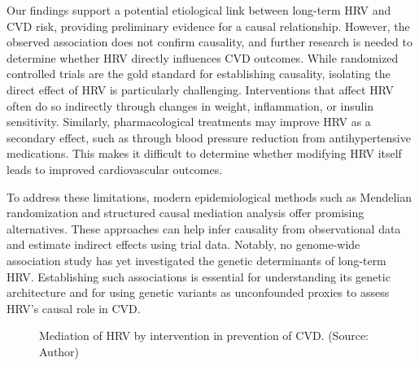 \documentclass[
  a4paper,
  headsepline=true,
  open=any]{scrbook}
\begin{document}
Our findings support a potential etiological link between long-term HRV
and CVD risk, providing preliminary evidence for a causal relationship.
However, the observed association does not confirm causality, and
further research is needed to determine whether HRV directly influences
CVD outcomes. While randomized controlled trials are the gold standard
for establishing causality, isolating the direct effect of HRV is
particularly challenging. Interventions that affect HRV often do so
indirectly through changes in weight, inflammation, or insulin
sensitivity. Similarly, pharmacological treatments may improve HRV as a
secondary effect, such as through blood pressure reduction from
antihypertensive medications. This makes it difficult to determine
whether modifying HRV itself leads to improved cardiovascular outcomes.

To address these limitations, modern epidemiological methods such as
Mendelian randomization and structured causal mediation analysis offer
promising alternatives. These approaches can help infer causality from
observational data and estimate indirect effects using trial data.
Notably, no genome-wide association study has yet investigated the
genetic determinants of long-term HRV. Establishing such associations is
essential for understanding its genetic architecture and for using
genetic variants as unconfounded proxies to assess HRV's causal role in
CVD.

\begin{figure}

\begin{minipage}[t]{\linewidth}

{\centering 


\caption{Mediation of HRV by intervention in prevention of CVD. (Source:
Author)}

}

\end{minipage}%

\end{figure}
\end{document}
